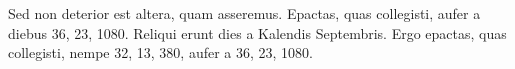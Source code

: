 

Sed
non deterior est altera, quam asseremus.
Epactas, quas collegisti,
aufer a diebus 36, 23, 1080.
Reliqui erunt dies a Kalendis Septembris.
Ergo epactas, quas collegisti, nempe 32, 13, 380, aufer a
36, 23, 1080.
























